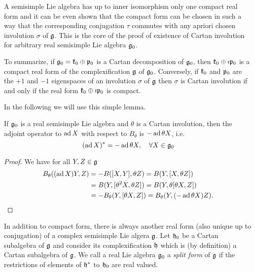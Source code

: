 A semisimple Lie algebra has up to inner isomorphism only one compact real form and it can be even shown that the compact form can be chosen in such a way that the corresponding conjugation $\tau$ commutes with any apriori chosen involution $\sigma$ of $\mathfrak{g}$. This is the core of the proof of existence of Cartan involution for arbitrary real semisimple Lie algebra $\mathfrak{g}_0$.

To summarize, if $\mathfrak{g}_0 = \mathfrak{k}_0 \oplus \mathfrak{p}_0$ is a Cartan decomposition of $\mathfrak{g}_0$, then $\mathfrak{k}_0 \oplus \imath \mathfrak{p}_0$ is a compact  real form of the complexification $\mathfrak{g}$ of $\mathfrak{g}_0$. Conversely, if $\mathfrak{k}_0$ and $\mathfrak{p}_0$ are the $+1$ and $-1$ eigenspaces of an involution $\sigma$ of $\mathfrak{g}$ then $\sigma$ is Cartan involution if and only if the real form $\mathfrak{k}_0 \oplus \imath \mathfrak{p}_0$  is compact.

In the following we will use this simple lemma.
\begin{lemma}\label{lem:theta_adjoint}
 If $\mathfrak{g}_0$ is a real semisimple Lie algebra and $\theta$ is a Cartan involution, then the adjoint operator to $\operatorname{\mathrm{ad}} X$ with respect to $B_\theta$ is $-\operatorname{\mathrm{ad}} \theta X$, i.e.
 \begin{equation*}
  (\operatorname{\mathrm{ad}} X)^* = -\operatorname{\mathrm{ad}} \theta X, \quad \forall X\in\mathfrak{g}_0
 \end{equation*}
\end{lemma}
\begin{proof}
  We have for all $Y,Z\in\mathfrak{g}$
  \begin{align*}
  B_\theta((\operatorname{\mathrm{ad}} X)Y,Z) &= -B([X,Y],\theta Z) = B(Y,[X,\theta Z]) \\
                       &= B(Y,[\theta^2 X, \theta Z]) = B(Y,\theta [\theta X, Z]) \\
		       &= -B_\theta(Y,[\theta X,Z]) = B_\theta(Y,(-\operatorname{\mathrm{ad}} \theta X)Z).
  \end{align*}
\end{proof}

In addition to compact form, there is always another real form (also unique up to conjugation) of a complex semisimple Lie algera $\mathfrak{g}$. Let $\mathfrak{h}_0$ be a Cartan subalgebra of $\mathfrak{g}$ and consider its complexification $\mathfrak{h}$ which is (by definition) a Cartan subalgebra of $\mathfrak{g}$. We call a real Lie algebra $\mathfrak{g}_0$ a \emph{split form} of $\mathfrak{g}$ if the restrictions of elements of $\mathfrak{h}^*$ to $\mathfrak{h}_0$ are real valued.

